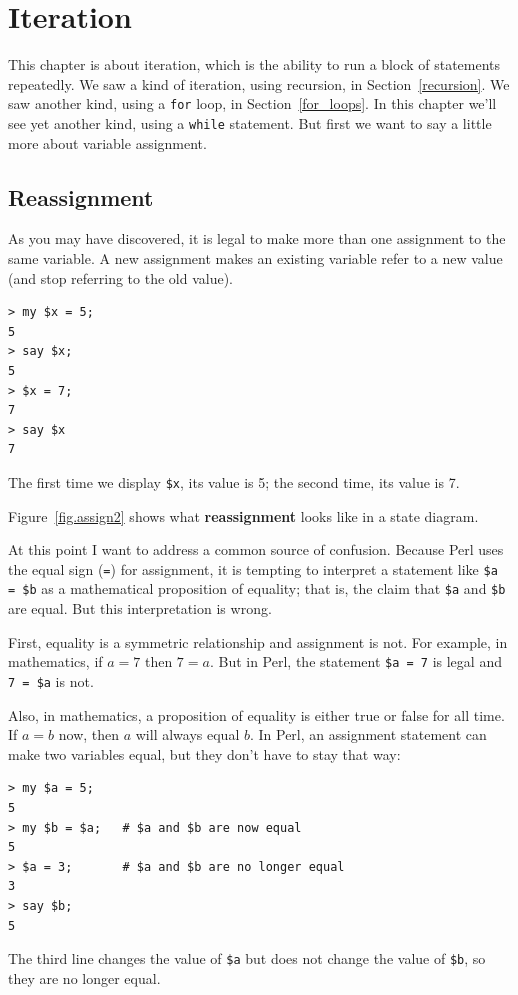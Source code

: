 
\chapter{Iteration}
\label{iteration}

This chapter is about iteration, which is the ability to run
a block of statements repeatedly.  We saw a kind of iteration,
using recursion, in Section~\ref{recursion}.
We saw another kind, using a {\tt for} loop,
in Section~\ref{for_loops}.  In this chapter we'll see yet another
kind, using a {\tt while} statement.
But first we want to say a little more about variable assignment.


\section{Reassignment}

As you may have discovered, it is legal to make more than one
assignment to the same variable.  A new assignment makes an existing
variable refer to a new value (and stop referring to the old value).

\begin{verbatim}
> my $x = 5;
5
> say $x;
5
> $x = 7;
7
> say $x
7
\end{verbatim}
%
The first time we display 
{\tt \$x}, its value is 5; the second time, its
value is 7.

Figure~\ref{fig.assign2} shows what {\bf reassignment} looks
like in a state diagram.  

At this point I want to address a common source of
confusion.
Because Perl uses the equal sign ({\tt =}) for assignment, it is
tempting to interpret a statement like {\tt \$a = \$b} as a
mathematical
proposition of equality; that is, the claim that {\tt \$a} and
{\tt \$b} are equal.  But this interpretation is wrong.

First, equality is a symmetric relationship and assignment is not.  For
example, in mathematics, if $a=7$ then $7=a$.  But in Perl, the
statement {\tt \$a = 7} is legal and {\tt 7 = \$a} is not.

Also, in mathematics, a proposition of equality is either true or
false for all time.  If $a=b$ now, then $a$ will always equal $b$.
In Perl, an assignment statement can make two variables equal, but
they don't have to stay that way:

\begin{verbatim}
> my $a = 5;
5
> my $b = $a;   # $a and $b are now equal
5
> $a = 3;       # $a and $b are no longer equal
3
> say $b;
5
\end{verbatim}
%
The third line changes the value of {\tt \$a} but does not change the
value of {\tt \$b}, so they are no longer equal. 

